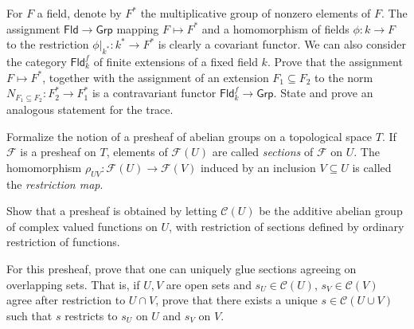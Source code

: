 \documentclass[11pt]{report}
\begin{document}
\begin{exercise}
	For $F$ a field, denote by $F^*$ the multiplicative group of nonzero elements of $F$. The assignment $\mathsf{Fld} \to \mathsf{Grp} $ mapping $F\mapsto F^*$ and a homomorphism of fields $\phi : k \to F$ to the restriction $\phi|_{k^*}: k^* \to F^*$ is clearly a covariant functor. We can also consider the category $\mathsf{Fld}_k^f$ of finite extensions of a fixed field $k$. Prove that the assignment $F\mapsto F^*$, together with the assignment of an extension $F_1\subseteq F_2$ to the norm $N_{F_1\subseteq F_2} : F_2^* \to F_1^*$ is a contravariant functor $\mathsf{Fld}_k^f\to \mathsf{Grp} $. State and prove an analogous statement for the trace.
\end{exercise}


\begin{exercise}
	Formalize the notion of a presheaf of abelian groups on a topological space $T$. If $\mathscr{F} $ is a presheaf on $T$, elements of $\mathscr{F} (U)$ are called \emph{sections} of $\mathscr{F} $ on $U$. The homomorphism $\rho_{UV} : \mathscr{F} (U) \to \mathscr{F} (V)$ induced by an inclusion $V\subseteq U$ is called the \emph{restriction map}.

	Show that a presheaf is obtained by letting $\mathscr{C} (U)$ be the additive abelian group of complex valued functions on $U$, with restriction of sections defined by ordinary restriction of functions.

	For this presheaf, prove that one can uniquely glue sections agreeing on overlapping sets. That is, if $U,V$ are open sets and $s_U\in \mathscr{C} (U)$, $s_V\in \mathscr{C} \left( V \right) $ agree after restriction to $U \cap V$, prove that there exists a unique $s\in \mathscr{C} (U \cup V)$ such that $s$ restricts to $s_U$ on $U$ and $s_V$ on $V$.
\end{exercise}
\end{document}
